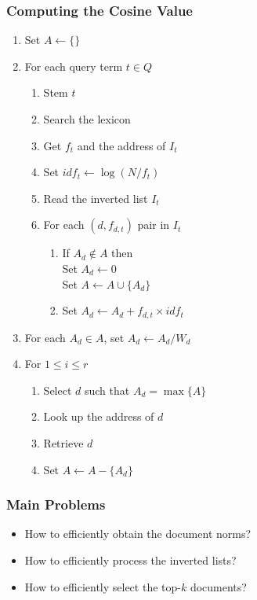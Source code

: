 \documentclass[svgnames]{beamer}
\newcommand{\fdt}{\ensuremath{f_{d,t}}}
\newcommand{\att}{\ensuremath{\leftarrow}}
\begin{document}

\begin{frame}
  \frametitle{Computing the Cosine Value}
  
  \begin{enumerate}
  \item Set $A \att \{\}$
  \item For each query term $t \in Q$
    \begin{enumerate}
    \item Stem $t$
    \item Search the lexicon
    \item Get $f_t$ and the address of $I_t$
    \item Set $idf_t \att \log(N/f_t)$
    \item Read the inverted list $I_t$
    \item For each $(d,\fdt)$ pair in $I_t$
      \begin{enumerate}
      \item If $A_d \not\in A$ then\\
        \hspace{4ex}Set $A_d \att 0$\\
        \hspace{4ex}Set $A \att A \cup \{A_d\}$
      \item Set $A_d \att A_d + \fdt \times idf_t$
      \end{enumerate}
    \end{enumerate}
  \item For each $A_d \in A$, set $A_d \att A_d/W_d$
  \item For $1 \leq i \leq r$
    \begin{enumerate}
    \item Select $d$ such that $A_d = \max\{A\}$
    \item Look up the address of $d$
    \item Retrieve $d$
    \item Set $A \att A - \{A_d\}$
    \end{enumerate}
  \end{enumerate}
\end{frame}


\begin{frame} \frametitle{Main Problems}
  

  \begin{block}{}
    \begin{itemize}
    \item How to efficiently obtain the document norms?
    \item How to efficiently process the inverted lists?
    \item How to efficiently select the top-$k$ documents?
    \end{itemize}
  \end{block}

\end{frame}
\end{document}
